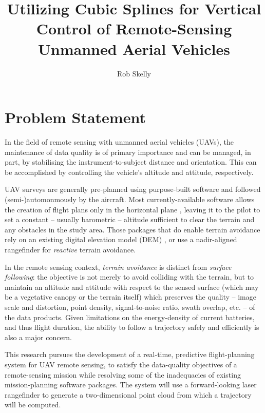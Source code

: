 \documentclass[doc]{apa6}
\title{Utilizing Cubic Splines for Vertical Control of Remote-Sensing Unmanned Aerial Vehicles}
\author{Rob Skelly}
\affiliation{University of Victoria}
\begin{document}
\maketitle

\section{Problem Statement}

In the field of remote sensing with unmanned aerial vehicles (UAVs), the maintenance of data quality is of primary importance and can be managed, in part, by stabilising the instrument-to-subject distance and orientation. This can be accomplished by controlling the vehicle's altitude and attitude, respectively.

UAV surveys are generally pre-planned using purpose-built software and followed (semi-)automonmously by the aircraft. Most currently-available software allows the creation of flight plans only in the horizontal plane \parencite[e.g.,][]{ArduPilot2018,DJI2018a,Microdrones2018,Group2018,UAVToolbox2018}, leaving it to the pilot to set a constant -- usually barometric -- altitude sufficient to clear the terrain and any obstacles in the study area. Those packages that do enable terrain avoidance rely on an  existing digital elevation model (DEM) \parencite[e.g.,][]{PrecisionHawk2018,UgCS2018,MapsMadeEasy2018}, or use a nadir-aligned rangefinder for \emph{reactive} terrain avoidance.

In the remote sensing context, \emph{terrain avoidance} is distinct from \emph{surface following}: the objective is not merely to avoid colliding with the terrain, but to maintain an altitude and attitude with respect to the sensed surface (which may be a vegetative canopy or the terrain itself) which preserves the quality -- image scale and distortion, point density, signal-to-noise ratio, swath overlap, etc. -- of the data products. Given limitations on the energy-density of current batteries, and thus flight duration, the ability to follow a trajectory safely and efficiently is also a major concern.

This research pursues the development of a real-time, predictive flight-planning system for UAV remote sensing, to satisfy the data-quality objectives of a remote-sensing mission while resolving some of the inadequacies of existing mission-planning software packages. The system will use a forward-looking laser rangefinder to generate a two-dimensional point cloud from which a trajectory will be computed.
\end{document}
